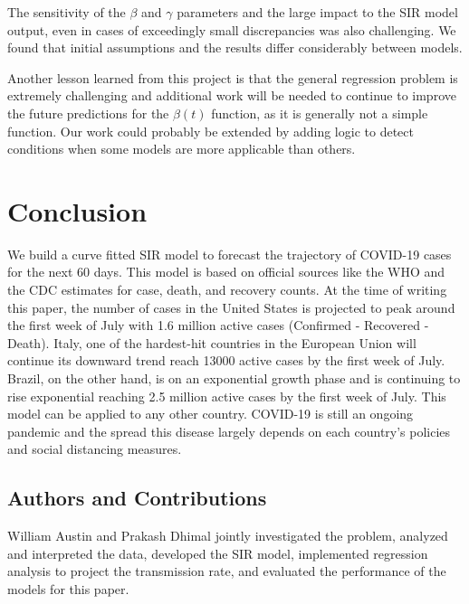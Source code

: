 \documentclass[11pt]{article}
\begin{document}
The sensitivity of the $\beta$ and $\gamma$ parameters and the large impact to the SIR model output, even in cases of exceedingly small discrepancies was also challenging. We found that initial assumptions and the results differ considerably between models. 

Another lesson learned from this project is that the general regression problem is extremely challenging and additional work will be needed to continue to improve the future predictions for the $\beta(t)$ function, as it is generally not a simple function. Our work could probably be extended by adding logic to detect conditions when some models are more applicable than others. 

\section{Conclusion}
We build a curve fitted SIR model to forecast the trajectory of COVID-19 cases for the next 60 days. This model is based on official sources like the WHO and the CDC estimates for case, death, and recovery counts. At the time of writing this paper, the number of cases in the United States is projected to peak around the first week of July with 1.6 million active cases (Confirmed - Recovered - Death). Italy, one of the hardest-hit countries in the European Union will continue its downward trend reach 13000 active cases by the first week of July. Brazil, on the other hand, is on an exponential growth phase and is continuing to rise exponential reaching 2.5 million active cases by the first week of July. This model can be applied to any other country. COVID-19 is still an ongoing pandemic and the spread this disease largely depends on each country's policies and social distancing measures.


\subsection{Authors and Contributions}
William Austin and Prakash Dhimal jointly investigated the problem, analyzed and interpreted the data, developed the SIR model, implemented regression analysis to project the transmission rate, and evaluated the performance of the models for this paper.

\nocite{epidemic-calculator}





\pagebreak


\listoffigures



\end{document}
